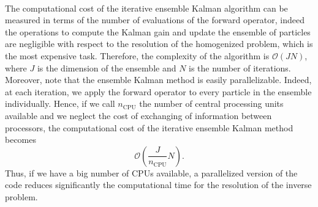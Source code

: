 \documentclass[10pt]{article}
\begin{document}
\begin{remark}
\leavevmode \\
The computational cost of the iterative ensemble Kalman algorithm can be measured in terms of the number of evaluations of the forward operator, indeed the operations to compute the Kalman gain and update the ensemble of particles are negligible with respect to the resolution of the homogenized problem, which is the most expensive task. Therefore, the complexity of the algorithm is $\mathcal{O}(JN)$, where $J$ is the dimension of the ensemble and $N$ is the number of iterations. Moreover, note that the ensemble Kalman method is easily parallelizable. Indeed, at each iteration, we apply the forward operator to every particle in the ensemble individually. Hence, if we call $n_{\mathrm{CPU}}$ the number of central processing units available and we neglect the cost of exchanging of information between processors, the computational cost of the iterative ensemble Kalman method becomes
\[ \mathcal{O} \left ( \frac{J}{n_{\mathrm{CPU}}} N \right ). \]
Thus, if we have a big number of CPUs available, a parallelized version of the code reduces significantly the computational time for the resolution of the inverse problem.
\end{remark}
\end{document}
